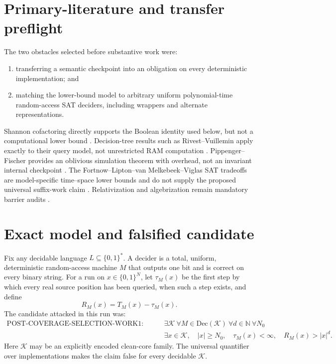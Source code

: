 \documentclass[11pt]{article}
\newcommand{\Dec}{\mathrm{Dec}}
\begin{document}
\section{Primary-literature and transfer preflight}
The two obstacles selected before substantive work were:
\begin{enumerate}
 \item transferring a semantic checkpoint into an obligation on every
 deterministic implementation; and
 \item matching the lower-bound model to arbitrary uniform polynomial-time
 random-access SAT deciders, including wrappers and alternate representations.
\end{enumerate}
Shannon cofactoring directly supports the Boolean identity used below, but not
a computational lower bound \cite{Shannon1949}. Decision-tree results such as
Rivest--Vuillemin apply exactly to their query model, not unrestricted RAM
computation \cite{RivestVuillemin1976}. Pippenger--Fischer provides an
oblivious simulation theorem with overhead, not an invariant internal
checkpoint \cite{PippengerFischer1979}. The Fortnow--Lipton--van
Melkebeek--Viglas SAT tradeoffs are model-specific time--space lower bounds
and do not supply the proposed universal suffix-work claim
\cite{FortnowEtAl2005}. Relativization and algebrization remain mandatory
barrier audits \cite{BGS1975,AW2009}.

\section{Exact model and falsified candidate}
Fix any decidable language \(L\subseteq\{0,1\}^*\). A decider is a total,
uniform, deterministic random-access machine \(M\) that outputs one bit and is
correct on every binary string. For a run on \(x\in\{0,1\}^N\), let
\(\tau_M(x)\) be the first step by which every real source position has been
queried, when such a step exists, and define
\[
 R_M(x)=T_M(x)-\tau_M(x).
\]
The candidate attacked in this run was:
\[
\begin{split}
\mathrm{POST\mbox{-}COVERAGE\mbox{-}SELECTION\mbox{-}WORK1}:\qquad
 &\exists\mathcal K\ \forall M\in\Dec(\mathcal K)\ \forall d\in\mathbb N\
 \forall N_0\\[-2mm]
 &\exists x\in\mathcal K,\quad |x|\ge N_0,\quad
 \tau_M(x)<\infty,\quad R_M(x)>|x|^d .
\end{split}
\]
Here \(\mathcal K\) may be an explicitly encoded clean-core family. The
universal quantifier over implementations makes the claim false for every
decidable \(\mathcal K\).
\end{document}

